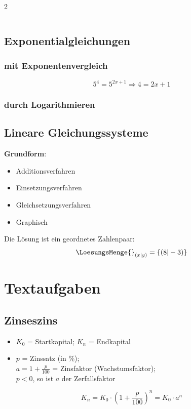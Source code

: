 \begin{multicols}{2}
\begin{tabular}{rcl}
\end{tabular}

\subsection*{Exponentialgleichungen}
\subsubsection*{mit Exponentenvergleich}

$$5^4 = 5^{2x+1} \Longrightarrow  4=2x+1$$

\subsubsection*{durch Logarithmieren}



\subsection*{Lineare Gleichungssysteme}
\textbf{Grundform}:

\begin{itemize}
\item Additionsverfahren
\item Einsetzungsverfahren
\item Gleichsetzungsverfahren
\item Graphisch
\end{itemize}
Die Lösung ist ein geordnetes Zahlenpaar:
$$\LoesungsMenge{}_{(x | y)} = \{(8 | -3)\}$$



\headerUndFooterJedeSeite{}
\newpage
\headerUndFooterJedeSeite{}


\section*{Textaufgaben}

\subsection*{Zinseszins}
\begin{itemize}
\item $K_0$ = Startkapital; $K_n$ = Endkapital
\item $p$ = Zinssatz (in \%);\\ $a = 1+\frac{p}{100}$ = Zinsfaktor
(Wachstumsfaktor);\\ $p<0$, so ist $a$ der Zerfallsfaktor
\end{itemize}
$$K_n = K_0 \cdot{} \left( 1+\frac{p}{100} \right)^n = K_0\cdot{}a^n$$


\end{multicols}
